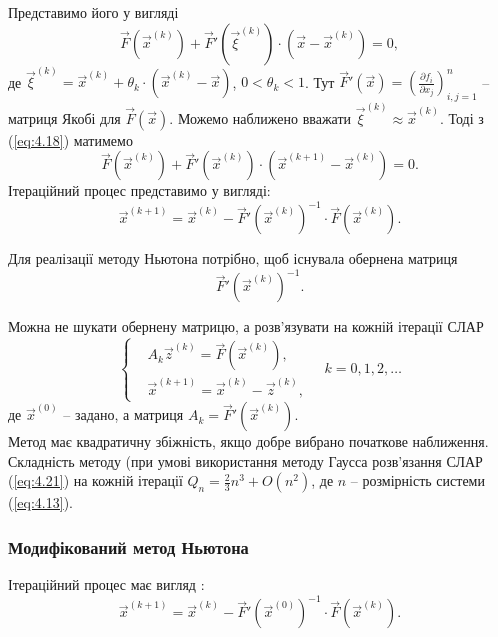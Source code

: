 Представимо його у вигляді
\begin{equation}
	\label{eq:4.18}
	\vec F\left(\vec x^{(k)}\right) + \vec F'\left(\vec \xi^{(k)}\right)\cdot\left(\vec x - \vec x^{(k)}\right) = 0,
\end{equation}
де $\vec \xi^{(k)} = \vec x^{(k)} + \theta_k \cdot \left(\vec x^{(k)} - \vec x\right)$, $0 < \theta_k < 1$. Тут  $\vec F'(\vec x) = \left(\frac{\partial f_i}{\partial x_j}\right)_{i,j=1}^n$ -- матриця Якобі для $\vec F(\vec x)$. Можемо наближено вважати $\vec \xi^{(k)} \approx \vec x^{(k)}$. Тоді з (\ref{eq:4.18}) матимемо
\begin{equation}
	\label{eq:4.19}
	\vec F\left(\vec x^{(k)}\right) + \vec F'\left(\vec x^{(k)}\right) \cdot\left(\vec x^{(k+1)} - \vec x^{(k)}\right) = 0.
\end{equation}
Ітераційний процес представимо у вигляді:
\begin{equation}
	\label{eq:4.20}
	\vec x^{(k+1)} = \vec x^{(k)} - \vec F'\left(\vec x^{(k)}\right)^{-1} \cdot \vec F\left(\vec x^{(k)}\right). 
\end{equation}

Для реалізації методу Ньютона потрібно, щоб існувала обернена матриця \[\vec F'\left(\vec x^{(k)}\right)^{-1}. \]

Можна не шукати обернену матрицю, а розв’язувати на кожній ітерації СЛАР
\begin{equation}
	\label{eq:4.21}
	\left\{
		\begin{aligned}
			& A_k \vec z^{(k)} = \vec F\left(\vec x^{(k)}\right), \\
			& \vec x^{(k + 1)} = \vec x^{(k)} - \vec z^{(k)},
		\end{aligned}
		\quad k=0,1,2,\ldots
	\right.
\end{equation}
де $\vec x^{(0)}$ -- задано, а матриця $A_k = \vec F'\left(\vec x^{(k)}\right)$. \\

Метод має квадратичну збіжність, якщо добре вибрано початкове наближення. Складність методу (при умові використання методу Гаусса розв'язання СЛАР (\ref{eq:4.21}) на кожній ітерації $Q_n = \frac23 n^3+O(n^2)$, де $n$ -- розмірність системи (\ref{eq:4.13}).

\subsubsection{Модифікований метод Ньютона}

Ітераційний процес має вигляд :
\[ \vec x^{(k+1)} = \vec x^{(k)} - \vec F'\left(\vec x^{(0)}\right)^{-1} \cdot\vec F\left(\vec x^{(k)}\right). \]

